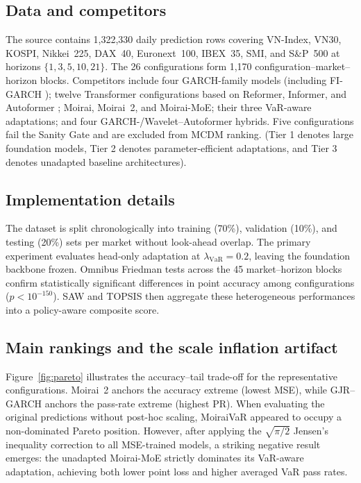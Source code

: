 \documentclass[runningheads]{llncs}
\begin{document}
\subsection{Data and competitors}

The source contains 1,322,330 daily prediction rows covering VN-Index, VN30,
KOSPI, Nikkei~225, DAX~40, Euronext~100, IBEX~35, SMI, and S\&P~500 at
horizons \(\{1,3,5,10,21\}\). The 26 configurations form 1,170
configuration--market--horizon blocks. Competitors include four GARCH-family
models (including FI-GARCH \cite{baillie1996}); twelve Transformer
configurations based on Reformer, Informer, and Autoformer
\cite{kitaev2020,informer2021,wu2021}; Moirai, Moirai~2, and Moirai-MoE;
their three VaR-aware adaptations; and four GARCH-/Wavelet--Autoformer
hybrids. Five configurations fail the Sanity Gate and are excluded from MCDM ranking.
(Tier 1 denotes large foundation models, Tier 2 denotes parameter-efficient
adaptations, and Tier 3 denotes unadapted baseline architectures).

\subsection{Implementation details}

The dataset is split chronologically into training (70\%), validation (10\%), and testing (20\%) sets per market without look-ahead overlap. The primary experiment evaluates head-only adaptation at \(\lambda_{\mathrm{VaR}}=0.2\), leaving the foundation backbone frozen. Omnibus Friedman tests across the 45 market--horizon blocks confirm statistically significant differences in point accuracy among configurations (\(p<10^{-150}\)). SAW and TOPSIS then aggregate these heterogeneous performances into a policy-aware composite score.

\subsection{Main rankings and the scale inflation artifact}

Figure~\ref{fig:pareto} illustrates the accuracy--tail trade-off for the representative configurations. Moirai~2 anchors the accuracy extreme (lowest MSE), while GJR--GARCH anchors the pass-rate extreme (highest PR). When evaluating the original predictions without post-hoc scaling, MoiraiVaR appeared to occupy a non-dominated Pareto position. However, after applying the \(\sqrt{\pi/2}\) Jensen's inequality correction to all MSE-trained models, a striking negative result emerges: the unadapted Moirai-MoE strictly dominates its VaR-aware adaptation, achieving both lower point loss and higher averaged VaR pass rates.
\end{document}

